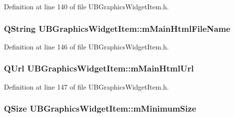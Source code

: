 Definition at line 140 of file U\-B\-Graphics\-Widget\-Item.\-h.

\hypertarget{class_u_b_graphics_widget_item_a9fd68562fc5e30285a919efda444ba23}{
\subsubsection[{m\-Main\-Html\-File\-Name}]{\setlength{\rightskip}{0pt plus 5cm}Q\-String U\-B\-Graphics\-Widget\-Item\-::m\-Main\-Html\-File\-Name\hspace{0.3cm}{\ttfamily [protected]}}}\label{d0/d16/class_u_b_graphics_widget_item_a9fd68562fc5e30285a919efda444ba23}


Definition at line 146 of file U\-B\-Graphics\-Widget\-Item.\-h.

\hypertarget{class_u_b_graphics_widget_item_aaf3a0394d38e8b1c3998b012411ce98f}{
\subsubsection[{m\-Main\-Html\-Url}]{\setlength{\rightskip}{0pt plus 5cm}Q\-Url U\-B\-Graphics\-Widget\-Item\-::m\-Main\-Html\-Url\hspace{0.3cm}{\ttfamily [protected]}}}\label{d0/d16/class_u_b_graphics_widget_item_aaf3a0394d38e8b1c3998b012411ce98f}


Definition at line 147 of file U\-B\-Graphics\-Widget\-Item.\-h.

\hypertarget{class_u_b_graphics_widget_item_ab49ce559c020b3c8e57cca0a708669ac}{
\subsubsection[{m\-Minimum\-Size}]{\setlength{\rightskip}{0pt plus 5cm}Q\-Size U\-B\-Graphics\-Widget\-Item\-::m\-Minimum\-Size\hspace{0.3cm}{\ttfamily [protected]}}}\label{d0/d16/class_u_b_graphics_widget_item_ab49ce559c020b3c8e57cca0a708669ac}


